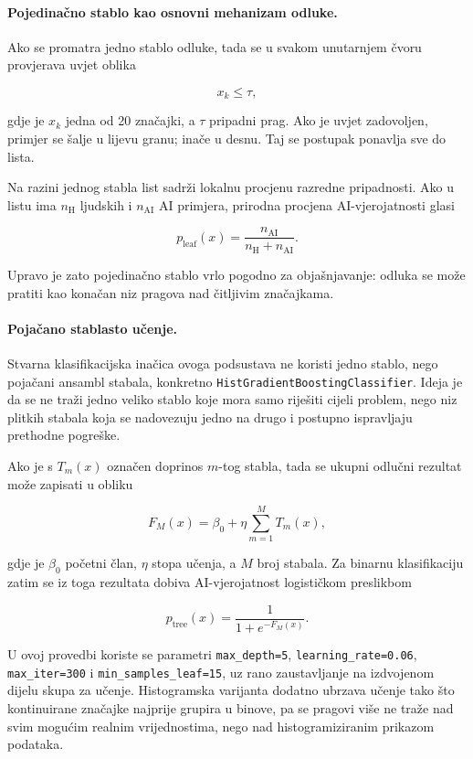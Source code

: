 \paragraph{Pojedinačno stablo kao osnovni mehanizam odluke.}
Ako se promatra jedno stablo odluke, tada se u svakom unutarnjem čvoru provjerava uvjet oblika

\[
x_k \le \tau,
\]

gdje je $x_k$ jedna od 20 značajki, a $\tau$ pripadni prag. Ako je uvjet zadovoljen, primjer se šalje u lijevu granu; inače u desnu. Taj se postupak ponavlja sve do lista.

Na razini jednog stabla list sadrži lokalnu procjenu razredne pripadnosti. Ako u listu ima $n_{\mathrm{H}}$ ljudskih i $n_{\mathrm{AI}}$ AI primjera, prirodna procjena AI-vjerojatnosti glasi

\[
p_{\mathrm{leaf}}(x)=\frac{n_{\mathrm{AI}}}{n_{\mathrm{H}}+n_{\mathrm{AI}}}.
\]

Upravo je zato pojedinačno stablo vrlo pogodno za objašnjavanje: odluka se može pratiti kao konačan niz pragova nad čitljivim značajkama.

\paragraph{Pojačano stablasto učenje.}
Stvarna klasifikacijska inačica ovoga podsustava ne koristi jedno stablo, nego pojačani ansambl stabala, konkretno \texttt{HistGradientBoostingClassifier}. Ideja je da se ne traži jedno veliko stablo koje mora samo riješiti cijeli problem, nego niz plitkih stabala koja se nadovezuju jedno na drugo i postupno ispravljaju prethodne pogreške.

Ako je s $T_m(x)$ označen doprinos $m$-tog stabla, tada se ukupni odlučni rezultat može zapisati u obliku

\[
F_M(x)=\beta_0 + \eta \sum_{m=1}^{M} T_m(x),
\]

gdje je $\beta_0$ početni član, $\eta$ stopa učenja, a $M$ broj stabala. Za binarnu klasifikaciju zatim se iz toga rezultata dobiva AI-vjerojatnost logističkom preslikbom

\[
p_{\mathrm{tree}}(x)=\frac{1}{1+e^{-F_M(x)}}.
\]

U ovoj provedbi koriste se parametri \texttt{max\_depth=5}, \texttt{learning\_rate=0.06}, \texttt{max\_iter=300} i \texttt{min\_samples\_leaf=15}, uz rano zaustavljanje na izdvojenom dijelu skupa za učenje. Histogramska varijanta dodatno ubrzava učenje tako što kontinuirane značajke najprije grupira u binove, pa se pragovi više ne traže nad svim mogućim realnim vrijednostima, nego nad histogramiziranim prikazom podataka.

